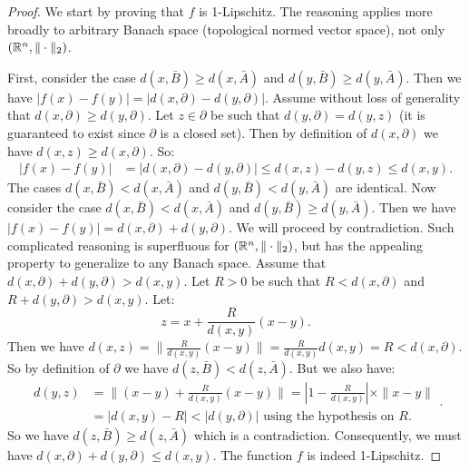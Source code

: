     \begin{proof}
        We start by proving that $f$ is \mbox{1-Lipschitz}. The reasoning applies more broadly to arbitrary Banach space (topological normed vector space), not only $(\mathbb{R}^n,\|\cdot\|_2)$.  
          
        First, consider the case $d(x,\bar{B})\geq d(x,\bar{A})$ and $d(y,\bar{B})\geq d(y,\bar{A})$. Then we have $|f(x)-f(y)|=|d(x,\partial)-d(y,\partial)|$. Assume without loss of generality that $d(x,\partial)\geq d(y,\partial)$. Let $z\in\partial$ be such that $d(y,\partial)=d(y,z)$ (it is guaranteed to exist since $\partial$ is a closed set). Then by definition of $d(x,\partial)$ we have $d(x,z)\geq d(x,\partial)$. So:
        \begin{equation}
            \begin{aligned}
            |f(x)-f(y)|&=|d(x,\partial)-d(y,\partial)|\leq d(x,z)-d(y,z)\leq d(x,y).
            \end{aligned}
        \end{equation}
        The cases $d(x,\bar{B}) < d(x,\bar{A})$ and $d(y,\bar{B}) < d(y,\bar{A})$ are identical.  
        Now consider the case $d(x,\bar{B})<d(x,\bar{A})$ and $d(y,\bar{B})\geq d(y,\bar{A})$. Then we have $|f(x)-f(y)|=d(x,\partial)+d(y,\partial)$. We will proceed by contradiction. Such complicated reasoning is superfluous for $(\mathbb{R}^n,\|\cdot\|_2)$, but has the appealing property to generalize to any Banach space. Assume that $d(x,\partial)+d(y,\partial)>d(x,y)$.  
        Let $R>0$ be such that $R<d(x,\partial)$ and $R+d(y,\partial)>d(x,y)$.   
        Let:
        $$z=x+\frac{R}{d(x,y)}(x-y).$$  
        Then we have $d(x,z)=\|\frac{R}{d(x,y)}(x-y)\|=\frac{R}{d(x,y)}d(x,y)=R<d(x,\partial)$.  
        So by definition of $\partial$ we have $d(z,\bar{B})<d(z,\bar{A})$.  
        But we also have:  
        \begin{equation}
            \begin{aligned}
            d(y,z)&=\|(x-y)+\frac{R}{d(x,y)}(x-y)\|=|1-\frac{R}{d(x,y)}|\times \|x-y\|\\
                  &=|d(x,y)-R|<|d(y,\partial)|\text{ using the hypothesis on }R.
            \end{aligned}.
        \end{equation}
        So we have $d(z,\bar{B})\geq d(z,\bar{A})$ which is a contradiction. Consequently, we must have $d(x,\partial)+d(y,\partial)\leq d(x,y)$. The function $f$ is indeed \mbox{1-Lipschitz}.  
          

\end{proof}
